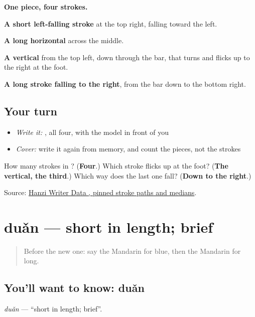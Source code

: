\begin{quote}
\end{quote}

\textbf{One piece, four strokes.}

\textbf{A short left-falling stroke} at the top right, falling toward the left.

\textbf{A long horizontal} across the middle.

\textbf{A vertical} from the top left, down through the bar, that turns and flicks up to the right at the foot.

\textbf{A long stroke falling to the right}, from the bar down to the bottom right.

\subsection*{Your turn}
\begin{itemize}
\raggedright
  \item \emph{Write it:} , all four, with the model in front of you
  \item \emph{Cover:} write it again from memory, and count the pieces, not the strokes
\end{itemize}

\begin{tcolorbox}[breakable,colback=teal!4,colframe=teal!35!black,title={Before you move on}]
How many strokes in ? (\textbf{Four}.) Which stroke flicks up at the foot? (\textbf{The vertical, the third}.) Which way does the last one fall? (\textbf{Down to the right}.)

Source: \href{https://raw.githubusercontent.com/chanind/hanzi-writer-data/68d10a4b21150cae5e1ebbd223eed289cf32d90c/data/\%E9\%95\%BF.json}{Hanzi Writer Data , pinned stroke paths and medians}.
\end{tcolorbox}
\section[duǎn]{duǎn — short in length; brief}

\label{lesson:ZH-C61-duan}



\begin{quote}
Before the new one: say the Mandarin for blue, then the Mandarin for long.
\end{quote}

\subsection*{You'll want to know: duǎn}
\emph{duǎn} — \textquotedblleft{}short in length; brief\textquotedblright{}.

